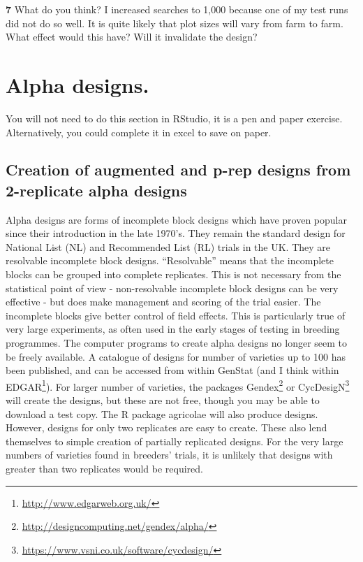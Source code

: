 \documentclass[
]{book}
\makeatletter
\renewcommand{\href}[2]{#2\footnote{\url{#1}}}
\newenvironment{kframe}{%
\medskip{}
\setlength{\fboxsep}{.8em}
 \def\at@end@of@kframe{}%
 \ifinner\ifhmode%
  \def\at@end@of@kframe{\end{minipage}}%
  \begin{minipage}{\columnwidth}%
 \fi\fi%
 \def\FrameCommand##1{\hskip\@totalleftmargin \hskip-\fboxsep
 \colorbox{shadecolor}{##1}\hskip-\fboxsep
     \hskip-\linewidth \hskip-\@totalleftmargin \hskip\columnwidth}%
 \MakeFramed {\advance\hsize-\width
   \@totalleftmargin\z@ \linewidth\hsize
   \@setminipage}}%
 {\par\unskip\endMakeFramed%
 \at@end@of@kframe}
\newenvironment{rmdblock}[1]
  {
  \begin{itemize}
  \renewcommand{\labelitemi}{
    \raisebox{-.7\height}[0pt][0pt]{
      {\setkeys{Gin}{width=3em,keepaspectratio}\texttt{[image: images/\#1]}}
    }
  }
  \setlength{\fboxsep}{1em}
  \begin{kframe}
  \item
  }
  {
  \end{kframe}
  \end{itemize}
  }
\newenvironment{rmdnote}
  {\begin{rmdblock}{note}}
  {\end{rmdblock}}
\newenvironment{rmdquiz}
  {\begin{rmdblock}{quiz}}
  {\end{rmdblock}}
\makeatother
\begin{document}
\begin{rmdquiz}
\textbf{7} What do you think? I increased searches to 1,000 because one of my test runs did not do so well. It is quite likely that plot sizes will vary from farm to farm. What effect would this have? Will it invalidate the design?
\end{rmdquiz}

\hypertarget{alpha-designs.}{%
\section{Alpha designs.}\label{alpha-designs.}}

\begin{rmdnote}
You will not need to do this section in RStudio, it is a pen and paper exercise. Alternatively, you could complete it in excel to save on paper.
\end{rmdnote}

\hypertarget{creation-of-augmented-and-p-rep-designs-from-2-replicate-alpha-designs}{%
\subsection{Creation of augmented and p-rep designs from 2-replicate alpha designs}\label{creation-of-augmented-and-p-rep-designs-from-2-replicate-alpha-designs}}

Alpha designs are forms of incomplete block designs which have proven popular since their introduction in the late 1970's. They remain the standard design for National List (NL) and Recommended List (RL) trials in the UK. They are resolvable incomplete block designs. ``Resolvable'' means that the incomplete blocks can be grouped into complete replicates. This is not necessary from the statistical point of view - non-resolvable incomplete block designs can be very effective - but does make management and scoring of the trial easier. The incomplete blocks give better control of field effects. This is particularly true of very large experiments, as often used in the early stages of testing in breeding programmes. The computer programs to create alpha designs no longer seem to be freely available. A catalogue of designs for number of varieties up to 100 has been published, and can be accessed from within GenStat (and I think within \href{http://www.edgarweb.org.uk/}{EDGAR}). For larger number of varieties, the packages \href{http://designcomputing.net/gendex/alpha/}{Gendex} or
\href{https://www.vsni.co.uk/software/cycdesign/}{CycDesigN} will create the designs, but these are not free, though you may be able to download a test copy. The R package agricolae \citep{R-agricolae} will also produce designs. However, designs for only two replicates are easy to create. These also lend themselves to simple creation of partially replicated designs. For the very large numbers of varieties found in breeders' trials, it is unlikely that designs with greater than two replicates would be required.
\end{document}
